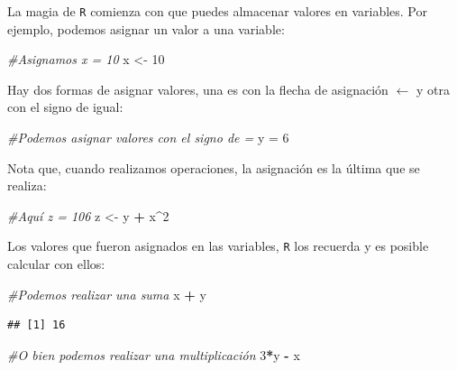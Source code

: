 \documentclass[
]{book}
\newenvironment{Shaded}{\begin{snugshade}}{\end{snugshade}}
\newcommand{\CommentTok}[1]{\textcolor[rgb]{0.56,0.35,0.01}{\textit{#1}}}
\newcommand{\DecValTok}[1]{\textcolor[rgb]{0.00,0.00,0.81}{#1}}
\newcommand{\NormalTok}[1]{#1}
\newcommand{\OperatorTok}[1]{\textcolor[rgb]{0.81,0.36,0.00}{\textbf{#1}}}
\newcommand{\StringTok}[1]{\textcolor[rgb]{0.31,0.60,0.02}{#1}}
\begin{document}
La magia de \texttt{R} comienza con que puedes almacenar valores en variables. Por ejemplo, podemos asignar un valor a una variable:

\begin{Shaded}
\begin{Highlighting}[]
\CommentTok{#Asignamos x = 10}
\NormalTok{x <-}\StringTok{ }\DecValTok{10}
\end{Highlighting}
\end{Shaded}

Hay dos formas de asignar valores, una es con la flecha de asignación \(\leftarrow\) y otra con el signo de igual:

\begin{Shaded}
\begin{Highlighting}[]
\CommentTok{#Podemos asignar valores con el signo de =}
\NormalTok{y =}\StringTok{ }\DecValTok{6}
\end{Highlighting}
\end{Shaded}

Nota que, cuando realizamos operaciones, la asignación es la última que se realiza:

\begin{Shaded}
\begin{Highlighting}[]
\CommentTok{#Aquí z = 106}
\NormalTok{z <-}\StringTok{ }\NormalTok{y }\OperatorTok{+}\StringTok{ }\NormalTok{x}\OperatorTok{^}\DecValTok{2}
\end{Highlighting}
\end{Shaded}

Los valores que fueron asignados en las variables, \texttt{R} los recuerda y es posible calcular con ellos:

\begin{Shaded}
\begin{Highlighting}[]
\CommentTok{#Podemos realizar una suma}
\NormalTok{x }\OperatorTok{+}\StringTok{ }\NormalTok{y}
\end{Highlighting}
\end{Shaded}

\begin{verbatim}
## [1] 16
\end{verbatim}

\begin{Shaded}
\begin{Highlighting}[]
\CommentTok{#O bien podemos realizar una multiplicación}
\DecValTok{3}\OperatorTok{*}\NormalTok{y }\OperatorTok{-}\StringTok{ }\NormalTok{x}
\end{Highlighting}
\end{Shaded}
\end{document}
